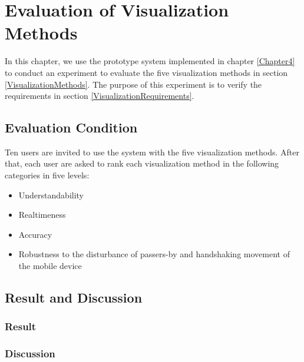 \chapter{Evaluation of Visualization Methods}
\label{Chapter5}

In this chapter, we use the prototype system implemented in chapter \ref{Chapter4} to conduct an experiment to evaluate the five visualization methods in section \ref{VisualizationMethods}. The purpose of this experiment is to verify the requirements in section \ref{VisualizationRequirements}.

\section{Evaluation Condition}

Ten users are invited to use the system with the five visualization methods. After that, each user are asked to rank each visualization method in the following categories in five levels:
\begin{itemize}
	\item Understandability
	\item Realtimeness
	\item Accuracy
	\item Robustness to the disturbance of passers-by and handshaking movement of the mobile device
\end{itemize}

\section{Result and Discussion}

\subsection{Result}

\subsection{Discussion}


